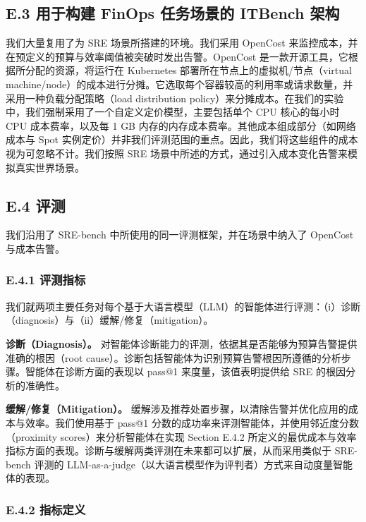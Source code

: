 \documentclass[10pt,UTF8,fontset=fandol]{ctexart}
\begin{document}
\subsection{E.3 用于构建 FinOps 任务场景的 ITBench 架构}

我们大量复用了为 SRE 场景所搭建的环境。我们采用 OpenCost 来监控成本，并在预定义的预算与效率阈值被突破时发出告警。OpenCost 是一款开源工具，它根据所分配的资源，将运行在 Kubernetes 部署所在节点上的虚拟机/节点（virtual machine/node）的成本进行分摊。它选取每个容器较高的利用率或请求数量，并采用一种负载分配策略（load distribution policy）来分摊成本。在我们的实验中，我们强制采用了一个自定义定价模型，主要包括单个 CPU 核心的每小时 CPU 成本费率，以及每 1 GB 内存的内存成本费率。其他成本组成部分（如网络成本与 Spot 实例定价）并非我们评测范围的重点。因此，我们将这些组件的成本视为可忽略不计。我们按照 SRE 场景中所述的方式，通过引入成本变化告警来模拟真实世界场景。

\subsection{E.4 评测}

我们沿用了 SRE-bench 中所使用的同一评测框架，并在场景中纳入了 OpenCost 与成本告警。

\subsubsection*{E.4.1 评测指标}

我们就两项主要任务对每个基于大语言模型（LLM）的智能体进行评测：（i）诊断（diagnosis）与（ii）缓解/修复（mitigation）。

\textbf{诊断（Diagnosis）。} 对智能体诊断能力的评测，依据其是否能够为预算告警提供准确的根因（root cause）。诊断包括智能体为识别预算告警根因所遵循的分析步骤。智能体在诊断方面的表现以 pass@1 来度量，该值表明提供给 SRE 的根因分析的准确性。

\textbf{缓解/修复（Mitigation）。} 缓解涉及推荐处置步骤，以清除告警并优化应用的成本与效率。我们使用基于 pass@1 分数的成功率来评测智能体，并使用邻近度分数（proximity scores）来分析智能体在实现 Section E.4.2 所定义的最优成本与效率指标方面的表现。诊断与缓解两类评测在未来都可以扩展，从而采用类似于 SRE-bench 评测的 LLM-as-a-judge（以大语言模型作为评判者）方式来自动度量智能体的表现。

\subsubsection*{E.4.2 指标定义}
\end{document}
